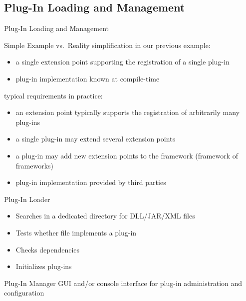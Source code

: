 \subsection{Plug-In Loading and Management}
\begin{frame}{Plug-In Loading and Management}
	\begin{fancycolumns}
		\begin{note}{Simple Example vs.\ Reality}
			simplification in our previous example:
			\begin{itemize}
				\item a single extension point supporting the registration of a single plug-in 
				\item plug-in implementation known at compile-time 
			\end{itemize}
			typical requirements in practice:
			\begin{itemize}
				\item an extension point typically supports the registration of arbitrarily many plug-ins
				\item a single plug-in may extend several extension points
				\item a plug-in may add new extension points to the framework (framework of frameworks)
				\item plug-in implementation provided by third parties %
			\end{itemize}
		\end{note}
	\nextcolumn
		\begin{definition}{Plug-In Loader}
			\begin{itemize}
				\item Searches in a dedicated directory for DLL/JAR/XML files
				\item Tests whether file implements a plug-in
				\item Checks dependencies
				\item Initializes plug-ins
			\end{itemize}
		\end{definition}
		\begin{definition}{Plug-In Manager}
			GUI and/or console interface for plug-in administration and configuration
		\end{definition}
	\end{fancycolumns}
\end{frame}

